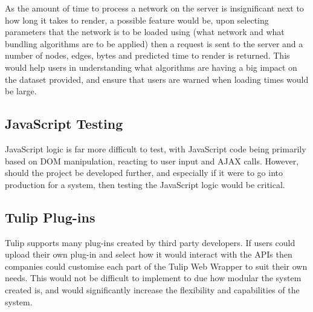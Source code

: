 \documentclass[../dissertation.tex]{subfiles}
\begin{document}
As the amount of time to process a network on the server is insignificant next to how long it takes to render, a possible feature would be, upon selecting parameters that the network is to be loaded using (what network and what bundling algorithms are to be applied) then a request is sent to the server and a number of nodes, edges, bytes and predicted time to render is returned. This would help users in understanding what algorithms are having a big impact on the dataset provided, and ensure that users are warned when loading times would be large.

\subsection{JavaScript Testing}

JavaScript logic is far more difficult to test, with JavaScript code being primarily based on DOM manipulation, reacting to user input and AJAX calls. However, should the project be developed further, and especially if it were to go into production for a system, then testing the JavaScript logic would be critical.

\subsection{Tulip Plug-ins}

Tulip supports many plug-ins created by third party developers. If users could upload their own plug-in and select how it would interact with the APIs then companies could customise each part of the Tulip Web Wrapper to suit their own needs. This would not be difficult to implement to due how modular the system created is, and would significantly increase the flexibility and capabilities of the system.
\end{document}
